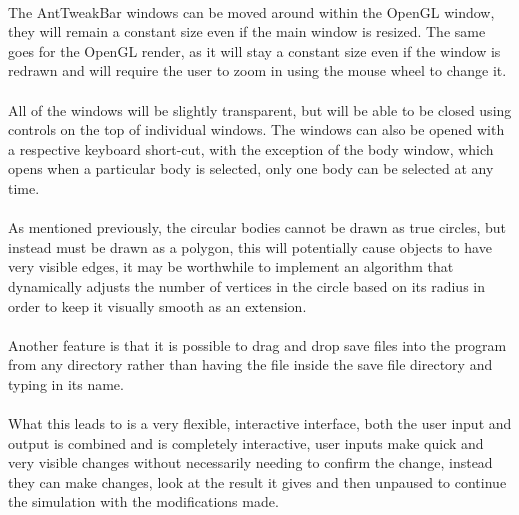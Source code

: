 \paragraph{}
The AntTweakBar windows can be moved around within the OpenGL window, they will remain a constant size even if the main window is resized. The same goes for the OpenGL render, as it will stay a constant size even if the window is redrawn and will require the user to zoom in using the mouse wheel to change it.

\paragraph{}
All of the windows will be slightly transparent, but will be able to be closed using controls on the top of individual windows. The windows can also be opened with a respective keyboard short-cut, with the exception of the body window, which opens when a particular body is selected, only one body can be selected at any time.

\paragraph{}
As mentioned previously, the circular bodies cannot be drawn as true circles, but instead must be drawn as a polygon, this will potentially cause objects to have very visible edges, it may be worthwhile to implement an algorithm that dynamically adjusts the number of vertices in the circle based on its radius in order to keep it visually smooth as an extension.

\paragraph{}
Another feature is that it is possible to drag and drop save files into the program from any directory rather than having the file inside the save file directory and typing in its name.

\paragraph{}
What this leads to is a very flexible, interactive interface, both the user input and output is combined and is completely interactive, user inputs make quick and very visible changes without necessarily needing to confirm the change, instead they can make changes, look at the result it gives and then unpaused to continue the simulation with the modifications made.

